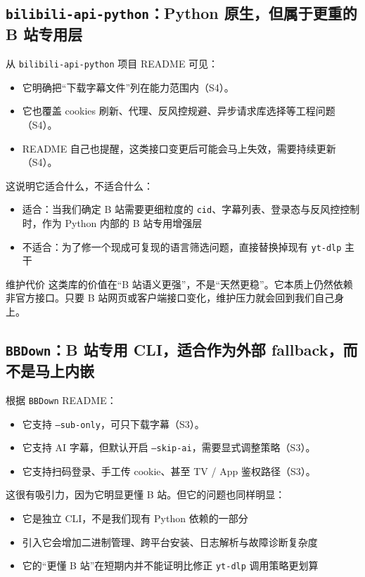 \documentclass[a4paper]{article}
\begin{document}
\subsection{\texttt{bilibili-api-python}：Python 原生，但属于更重的 B 站专用层}

从 \texttt{bilibili-api-python} 项目 README 可见：
\begin{itemize}
\item 它明确把“下载字幕文件”列在能力范围内（S4）。
\item 它也覆盖 cookies 刷新、代理、反风控规避、异步请求库选择等工程问题（S4）。
\item README 自己也提醒，这类接口变更后可能会马上失效，需要持续更新（S4）。
\end{itemize}

这说明它适合什么，不适合什么：
\begin{itemize}
\item 适合：当我们确定 B 站需要更细粒度的 \texttt{cid}、字幕列表、登录态与反风控控制时，作为 Python 内部的 B 站专用增强层
\item 不适合：为了修一个现成可复现的语言筛选问题，直接替换掉现有 \texttt{yt-dlp} 主干
\end{itemize}

\begin{riskbox}{维护代价}
这类库的价值在“B 站语义更强”，不是“天然更稳”。它本质上仍然依赖非官方接口。只要 B 站网页或客户端接口变化，维护压力就会回到我们自己身上。
\end{riskbox}

\subsection{\texttt{BBDown}：B 站专用 CLI，适合作为外部 fallback，而不是马上内嵌}

根据 \texttt{BBDown} README：
\begin{itemize}
\item 它支持 \texttt{--sub-only}，可只下载字幕（S3）。
\item 它支持 AI 字幕，但默认开启 \texttt{--skip-ai}，需要显式调整策略（S3）。
\item 它支持扫码登录、手工传 cookie、甚至 TV / App 鉴权路径（S3）。
\end{itemize}

这很有吸引力，因为它明显更懂 B 站。但它的问题也同样明显：
\begin{itemize}
\item 它是独立 CLI，不是我们现有 Python 依赖的一部分
\item 引入它会增加二进制管理、跨平台安装、日志解析与故障诊断复杂度
\item 它的“更懂 B 站”在短期内并不能证明比修正 \texttt{yt-dlp} 调用策略更划算
\end{itemize}
\end{document}
